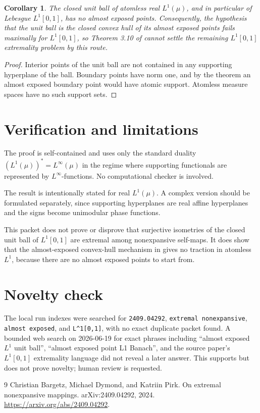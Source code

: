 \documentclass[11pt]{article}
\newtheorem{corollary}{Corollary}
\begin{document}
\begin{corollary}
The closed unit ball of atomless real \(L^1(\mu)\), and in particular of
Lebesgue \(L^1[0,1]\), has no almost exposed points. Consequently, the
hypothesis that the unit ball is the closed convex hull of its almost exposed
points fails maximally for \(L^1[0,1]\), so Theorem 3.10 of \cite{BDP} cannot
settle the remaining \(L^1[0,1]\) extremality problem by this route.
\end{corollary}

\begin{proof}
Interior points of the unit ball are not contained in any supporting
hyperplane of the ball. Boundary points have norm one, and by the theorem an
almost exposed boundary point would have atomic support. Atomless measure
spaces have no such support sets.
\end{proof}

\section*{Verification and limitations}

The proof is self-contained and uses only the standard duality
\((L^1(\mu))^*=L^\infty(\mu)\) in the regime where supporting functionals are
represented by \(L^\infty\)-functions. No computational checker is involved.

The result is intentionally stated for real \(L^1(\mu)\). A complex version
should be formulated separately, since supporting hyperplanes are real affine
hyperplanes and the signs become unimodular phase functions.

This packet does not prove or disprove that surjective isometries of the
closed unit ball of \(L^1[0,1]\) are extremal among nonexpansive self-maps. It
does show that the almost-exposed convex-hull mechanism in \cite{BDP} gives no
traction in atomless \(L^1\), because there are no almost exposed points to
start from.

\section*{Novelty check}

The local run indexes were searched for \texttt{2409.04292},
\texttt{extremal nonexpansive}, \texttt{almost exposed}, and
\texttt{L\^{}1[0,1]}, with no exact duplicate packet found. A bounded web
search on 2026-06-19 for exact phrases including ``almost exposed \(L^1\)
unit ball'', ``almost exposed point L1 Banach'', and the source paper's
\(L^1[0,1]\) extremality language did not reveal a later answer. This supports
but does not prove novelty; human review is requested.

\begin{thebibliography}{9}
Christian Bargetz, Michael Dymond, and Katriin Pirk.
\newblock On extremal nonexpansive mappings.
\newblock arXiv:2409.04292, 2024.
\newblock \url{https://arxiv.org/abs/2409.04292}.
\end{thebibliography}
\end{document}
